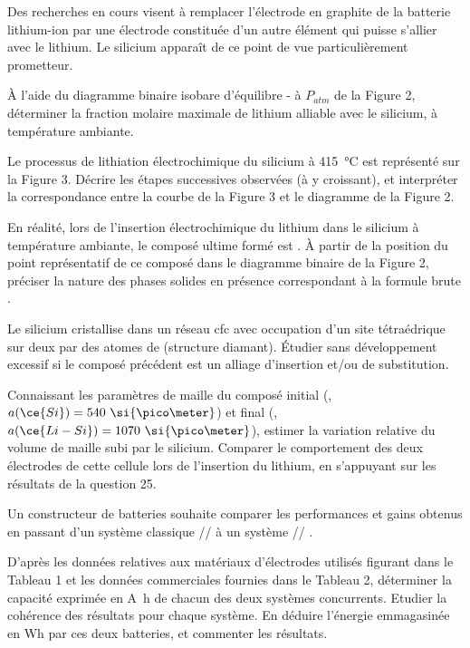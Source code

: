 Des recherches en cours visent à remplacer l’électrode en graphite de la batterie lithium-ion par une électrode constituée d’un autre élément qui puisse s’allier avec le lithium. Le silicium apparaît de ce point de vue particulièrement prometteur.

\Q \`{A} l’aide du diagramme binaire isobare d’équilibre - à $P_{atm}$ de la Figure 2, déterminer la fraction molaire maximale de lithium alliable avec le silicium, à température ambiante.

\Q Le processus de lithiation électrochimique du silicium à \SI{415}{\celsius} est représenté sur la Figure 3. Décrire les étapes successives observées (à y croissant), et interpréter la correspondance entre la courbe de la Figure 3 et le diagramme de la Figure 2.

\Q En réalité, lors de l’insertion électrochimique du lithium dans le silicium à température ambiante, le composé ultime formé est . À partir de la position du point représentatif de ce composé dans le diagramme binaire de la Figure 2, préciser la nature des phases solides en présence correspondant à la formule brute  .

\Q Le silicium cristallise dans un réseau cfc avec occupation d’un site tétraédrique sur deux par des atomes de  (structure diamant). Étudier sans développement excessif si le composé précédent  est un alliage d’insertion et/ou de substitution.

\Q Connaissant les paramètres de maille du composé initial (, $a(\ce{Si}) = 540 ~ \si{\pico\meter}$) et final (, $a(\ce{Li-Si}) = 1070 ~ \si{\pico\meter}$), estimer la variation relative du volume de maille subi par le silicium. Comparer le comportement des deux électrodes de cette cellule lors de l’insertion du lithium, en s’appuyant sur les résultats de la question 25.

Un constructeur de batteries souhaite comparer les performances et gains obtenus en passant d’un système classique  //  à un système  // .

\Q D’après les données relatives aux matériaux d’électrodes utilisés figurant dans le Tableau 1 et les données commerciales fournies dans le Tableau 2, déterminer la capacité exprimée en \si{\ampere\hour} de chacun des deux systèmes concurrents. Etudier la cohérence des résultats pour chaque système. En déduire l’énergie emmagasinée en Wh par ces deux batteries, et commenter les résultats.

